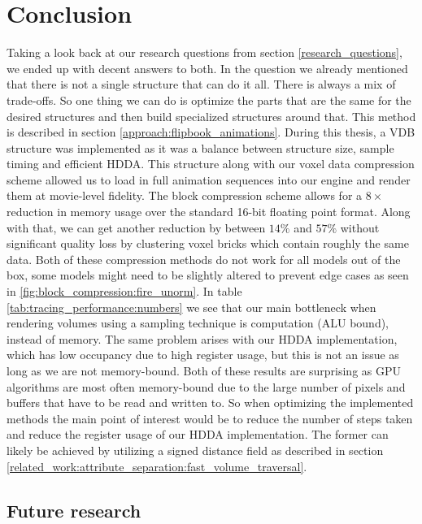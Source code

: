 \section{Conclusion} \label{conclusion}
Taking a look back at our research questions from section \ref{research_questions}, we ended up with decent answers to both. In the question we already mentioned that there is not a single structure that can do it all. There is always a mix of trade-offs. So one thing we can do is optimize the parts that are the same for the desired structures and then build specialized structures around that. This method is described in section \ref{approach:flipbook_animations}. During this thesis, a VDB structure was implemented as it was a balance between structure size, sample timing and efficient HDDA. This structure along with our voxel data compression scheme allowed us to load in full animation sequences into our engine and render them at movie-level fidelity. The block compression scheme allows for a $8\times$ reduction in memory usage over the standard 16-bit floating point format. Along with that, we can get another reduction by between $14\%$ and $57\%$ without significant quality loss by clustering voxel bricks which contain roughly the same data. Both of these compression methods do not work for all models out of the box, some models might need to be slightly altered to prevent edge cases as seen in \ref{fig:block_compression:fire_unorm}. In table \ref{tab:tracing_performance:numbers} we see that our main bottleneck when rendering volumes using a sampling technique is computation (ALU bound), instead of memory. The same problem arises with our HDDA implementation, which has low occupancy due to high register usage, but this is not an issue as long as we are not memory-bound. Both of these results are surprising as GPU algorithms are most often memory-bound due to the large number of pixels and buffers that have to be read and written to. So when optimizing the implemented methods the main point of interest would be to reduce the number of steps taken and reduce the register usage of our HDDA implementation. The former can likely be achieved by utilizing a signed distance field as described in section \ref{related_work:attribute_separation:fast_volume_traversal}.

\subsection{Future research} \label{conclusion:future_research}

